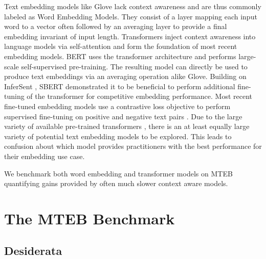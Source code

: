 \documentclass[11pt]{article}
\begin{document}
Text embedding models like Glove \cite{pennington2014glove} lack context awareness and are thus commonly labeled as Word Embedding Models. They consist of a layer mapping each input word to a vector often followed by an averaging layer to provide a final embedding invariant of input length. Transformers \cite{vaswani2017attention} inject context awareness into language models via self-attention and form the foundation of most recent embedding models. BERT \cite{devlin2018bert} uses the transformer architecture and performs large-scale self-supervised pre-training. The resulting model can directly be used to produce text embeddings via an averaging operation alike Glove. Building on InferSent \cite{conneau2017supervised}, SBERT \cite{reimers2019sentence} demonstrated it to be beneficial to perform additional fine-tuning of the transformer for competitive embedding performance. Most recent fine-tuned embedding models use a contrastive loss objective to perform supervised fine-tuning on positive and negative text pairs \cite{gao2021simcse, wang2021tsdae, ni2021large, muennighoff2022sgpt}. Due to the large variety of available pre-trained transformers \cite{wolf2020transformers}, there is an at least equally large variety of potential text embedding models to be explored. This leads to confusion about which model provides practitioners with the best performance for their embedding use case.

We benchmark both word embedding and transformer models on MTEB quantifying gains provided by often much slower context aware models.

\section{The MTEB Benchmark}

\subsection{Desiderata}
\label{sec:desiderata}
\end{document}
